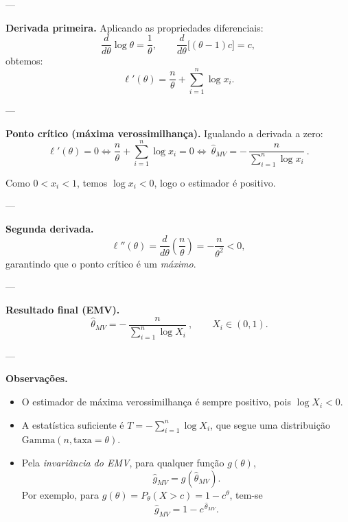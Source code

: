 ---

\textbf{Derivada primeira.}
Aplicando as propriedades diferenciais:
\[
\frac{d}{d\theta}\log\theta = \frac{1}{\theta},
\qquad 
\frac{d}{d\theta}\big[(\theta-1)c\big]=c,
\]
obtemos:
\[
\ell'(\theta) 
= \frac{n}{\theta} + \sum_{i=1}^n \log x_i.
\]

---

\textbf{Ponto crítico (máxima verossimilhança).}
Igualando a derivada a zero:
\[
\ell'(\theta)=0 
\iff 
\frac{n}{\theta} + \sum_{i=1}^n \log x_i = 0
\iff 
\boxed{\ \widehat{\theta}_{MV} = -\,\frac{n}{\displaystyle\sum_{i=1}^n \log x_i}\ }.
\]

Como $0 < x_i < 1$, temos $\log x_i < 0$, logo o estimador é positivo.

---

\textbf{Segunda derivada.}
\[
\ell''(\theta) = \frac{d}{d\theta}\!\left(\frac{n}{\theta}\right)
= -\frac{n}{\theta^2} < 0,
\]
garantindo que o ponto crítico é um \textit{máximo}.

---

\textbf{Resultado final (EMV).}
\[
\boxed{\ \widehat{\theta}_{MV}
= -\,\frac{n}{\displaystyle\sum_{i=1}^n \log X_i}\ },
\qquad X_i\in(0,1).
\]

---

\textbf{Observações.}
\begin{itemize}
  \item O estimador de máxima verossimilhança é sempre positivo, pois $\log X_i < 0$.
  \item A estatística suficiente é $T = -\sum_{i=1}^n \log X_i$, que segue uma distribuição $\mathrm{Gamma}(n,\text{taxa}=\theta)$.
  \item Pela \textit{invariância do EMV}, para qualquer função $g(\theta)$,
  \[
  \widehat g_{MV} = g(\widehat{\theta}_{MV}).
  \]
  Por exemplo, para $g(\theta)=P_\theta(X>c)=1-c^\theta$, tem-se
  \[
  \widehat g_{MV}=1-c^{\,\widehat{\theta}_{MV}}.
  \]
\end{itemize}